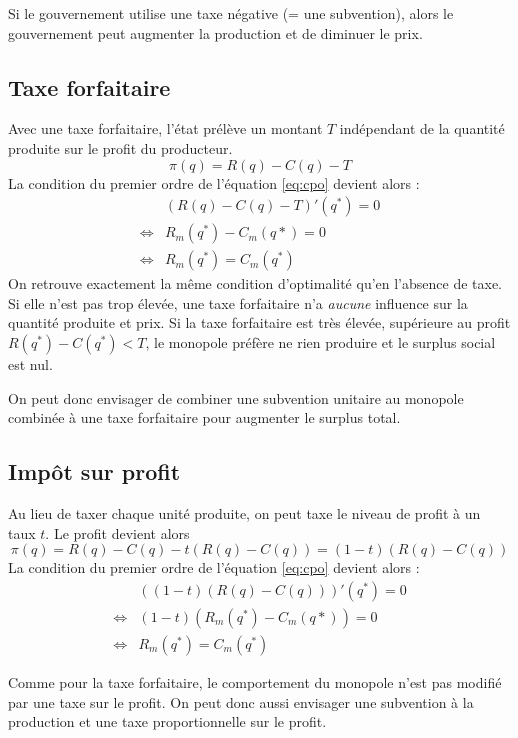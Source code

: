 \documentclass[
]{book}
\theoremstyle{definition}
\theoremstyle{definition}
\theoremstyle{definition}
\theoremstyle{definition}
\theoremstyle{remark}
\begin{document}
Si le gouvernement utilise une taxe négative (= une subvention), alors le gouvernement peut augmenter la production et de diminuer le prix.

\hypertarget{taxe-forfaitaire}{%
\subsection{Taxe forfaitaire}\label{taxe-forfaitaire}}

Avec une taxe forfaitaire, l'état prélève un montant \(T\) indépendant de la quantité produite sur le profit du producteur.
\[
\pi(q) = R(q) - C(q) -T
\]
La condition du premier ordre de l'équation \eqref{eq:cpo} devient alors :
\[
\begin{array}{rl}
& (R(q)-C(q) -T)'(q^*) = 0\\
\Leftrightarrow & R_m(q^*)-C_m(q*) = 0\\
\Leftrightarrow & R_m(q^*) = C_m(q^*)
\end{array}
\]
On retrouve exactement la même condition d'optimalité qu'en l'absence de taxe.
Si elle n'est pas trop élevée, une taxe forfaitaire n'a \emph{aucune} influence sur la quantité produite et prix.
Si la taxe forfaitaire est très élevée, supérieure au profit \(R(q^*) - C(q^*) <T\), le monopole préfère ne rien produire et le surplus social est nul.

On peut donc envisager de combiner une subvention unitaire au monopole combinée à une taxe forfaitaire pour augmenter le surplus total.

\hypertarget{impuxf4t-sur-profit}{%
\subsection{Impôt sur profit}\label{impuxf4t-sur-profit}}

Au lieu de taxer chaque unité produite, on peut taxe le niveau de profit à un taux \(t\).
Le profit devient alors
\[
\pi(q) = R(q) - C(q) -t( R(q) - C(q)) = (1-t)(R(q) - C(q))
\]
La condition du premier ordre de l'équation \eqref{eq:cpo} devient alors :
\[
\begin{array}{rl}
&((1-t)(R(q)-C(q)))'(q^*) = 0\\
\Leftrightarrow & (1-t)(R_m(q^*)-C_m(q*)) = 0\\
\Leftrightarrow & R_m(q^*) = C_m(q^*)
\end{array}
\]

Comme pour la taxe forfaitaire, le comportement du monopole n'est pas modifié par une taxe sur le profit.
On peut donc aussi envisager une subvention à la production et une taxe proportionnelle sur le profit.
\end{document}
